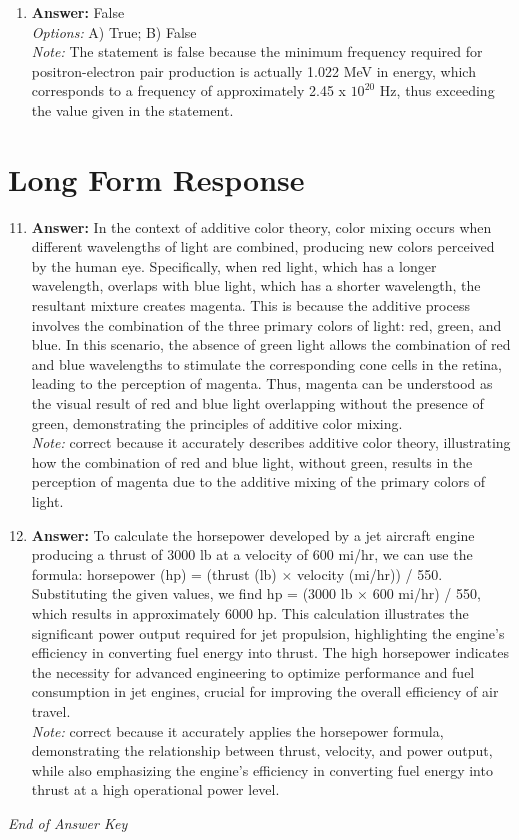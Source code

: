 \documentclass[12pt]{article}
\begin{document}
\begin{enumerate}[label=\arabic*.]
\item \textbf{Answer:} False
\\ \textit{Options:} A) True; B) False
\\ \textit{Note:} The statement is false because the minimum frequency required for positron-electron pair production is actually 1.022 MeV in energy, which corresponds to a frequency of approximately 2.45 x $10^20$ Hz, thus exceeding the value given in the statement.
\end{enumerate}

\section*{Long Form Response}
\begin{enumerate}[label=\arabic*.]
\setcounter{enumi}{10}
\item \textbf{Answer:} In the context of additive color theory, color mixing occurs when different wavelengths of light are combined, producing new colors perceived by the human eye. Specifically, when red light, which has a longer wavelength, overlaps with blue light, which has a shorter wavelength, the resultant mixture creates magenta. This is because the additive process involves the combination of the three primary colors of light: red, green, and blue. In this scenario, the absence of green light allows the combination of red and blue wavelengths to stimulate the corresponding cone cells in the retina, leading to the perception of magenta. Thus, magenta can be understood as the visual result of red and blue light overlapping without the presence of green, demonstrating the principles of additive color mixing.
\\ \textit{Note:} correct because it accurately describes additive color theory, illustrating how the combination of red and blue light, without green, results in the perception of magenta due to the additive mixing of the primary colors of light.
\item \textbf{Answer:} To calculate the horsepower developed by a jet aircraft engine producing a thrust of 3000 lb at a velocity of 600 mi/hr, we can use the formula: horsepower (hp) = (thrust (lb) \ensuremath{\times} velocity (mi/hr)) / 550. Substituting the given values, we find hp = (3000 lb \ensuremath{\times} 600 mi/hr) / 550, which results in approximately 6000 hp. This calculation illustrates the significant power output required for jet propulsion, highlighting the engine's efficiency in converting fuel energy into thrust. The high horsepower indicates the necessity for advanced engineering to optimize performance and fuel consumption in jet engines, crucial for improving the overall efficiency of air travel.
\\ \textit{Note:} correct because it accurately applies the horsepower formula, demonstrating the relationship between thrust, velocity, and power output, while also emphasizing the engine's efficiency in converting fuel energy into thrust at a high operational power level.
\end{enumerate}

\vfill
\noindent\textit{End of Answer Key}
\end{document}
